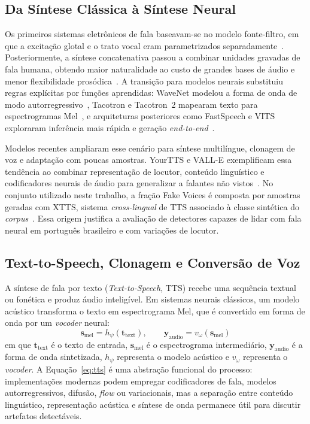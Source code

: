 \documentclass[12pt,a4paper]{article}
\begin{document}
\subsection{Da Síntese Clássica à Síntese Neural}

Os primeiros sistemas eletrônicos de fala baseavam-se no modelo fonte-filtro,
em que a excitação glotal e o trato vocal eram parametrizados separadamente~\cite{dudley1939,klatt1987}. Posteriormente, a síntese concatenativa passou a
combinar unidades gravadas de fala humana, obtendo maior naturalidade ao custo
de grandes bases de áudio e menor flexibilidade prosódica~\cite{hunt1996}. A
transição para modelos neurais substituiu regras explícitas por funções
aprendidas: WaveNet modelou a forma de onda de modo autorregressivo~\cite{oord2016wavenet}, Tacotron e Tacotron~2 mapearam texto para
espectrogramas Mel~\cite{wang2017,shen2018natural}, e arquiteturas posteriores
como FastSpeech e VITS exploraram inferência mais rápida e geração
\textit{end-to-end}~\cite{ren2019fastspeech,kim2021conditional}.

Modelos recentes ampliaram esse cenário para síntese multilíngue, clonagem de
voz e adaptação com poucas amostras. YourTTS e VALL-E exemplificam essa
tendência ao combinar representação de locutor, conteúdo linguístico e
codificadores neurais de áudio para generalizar a falantes não vistos~\cite{casanova2022yourtts,wang2023vall}. No conjunto utilizado neste trabalho, a
fração Fake Voices é composta por amostras geradas com XTTS, sistema
\textit{cross-lingual} de TTS associado à classe sintética do \textit{corpus}~\cite{fakevoices_card}. Essa origem justifica a avaliação de detectores capazes
de lidar com fala neural em português brasileiro e com variações de locutor.

\subsection{Text-to-Speech, Clonagem e Conversão de Voz}

A síntese de fala por texto (\textit{Text-to-Speech}, TTS) recebe uma sequência
textual ou fonética e produz áudio inteligível. Em sistemas neurais clássicos,
um modelo acústico transforma o texto em espectrograma Mel, que é convertido em
forma de onda por um \textit{vocoder} neural:
\begin{equation}
	\label{eq:tts}
	\mathbf{s}_{\mathrm{mel}} = h_{\psi}(\mathbf{t}_{\mathrm{text}}), \qquad
	\mathbf{y}_{\mathrm{audio}} = v_{\omega}(\mathbf{s}_{\mathrm{mel}})
\end{equation}
\noindent
em que $\mathbf{t}_{\mathrm{text}}$ é o texto de entrada,
$\mathbf{s}_{\mathrm{mel}}$ é o espectrograma intermediário,
$\mathbf{y}_{\mathrm{audio}}$ é a forma de onda sintetizada,
$h_{\psi}$ representa o modelo acústico e $v_{\omega}$ representa o
\textit{vocoder}. A Equação~\ref{eq:tts} é uma abstração funcional do processo:
implementações modernas podem empregar codificadores de fala, modelos
autorregressivos, difusão, \textit{flow} ou variacionais, mas a separação entre
conteúdo linguístico, representação acústica e síntese de onda permanece útil
para discutir artefatos detectáveis.
\end{document}
